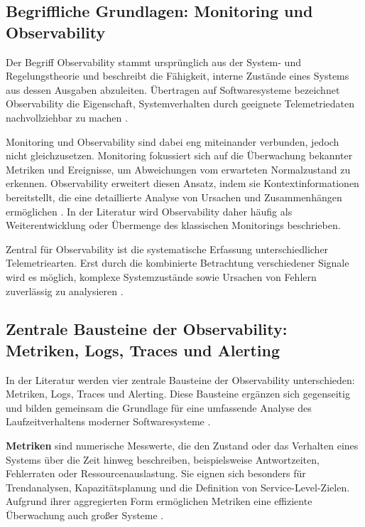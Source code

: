 \subsection{Begriffliche Grundlagen: Monitoring und Observability}

Der Begriff Observability stammt ursprünglich aus der System- und Regelungstheorie und beschreibt die Fähigkeit, interne Zustände eines Systems aus dessen Ausgaben abzuleiten. Übertragen auf Softwaresysteme bezeichnet Observability die Eigenschaft, Systemverhalten durch geeignete Telemetriedaten nachvollziehbar zu machen \cite{sridharan2018distributed}. 

Monitoring und Observability sind dabei eng miteinander verbunden, jedoch nicht gleichzusetzen. Monitoring fokussiert sich auf die Überwachung bekannter Metriken und Ereignisse, um Abweichungen vom erwarteten Normalzustand zu erkennen. Observability erweitert diesen Ansatz, indem sie Kontextinformationen bereitstellt, die eine detaillierte Analyse von Ursachen und Zusammenhängen ermöglichen \cite{faseeha2025observability}. In der Literatur wird Observability daher häufig als Weiterentwicklung oder Übermenge des klassischen Monitorings beschrieben.

Zentral für Observability ist die systematische Erfassung unterschiedlicher Telemetriearten. Erst durch die kombinierte Betrachtung verschiedener Signale wird es möglich, komplexe Systemzustände sowie Ursachen von Fehlern zuverlässig zu analysieren \cite{abieba2025advanced,sakinala2025observability}.

\subsection{Zentrale Bausteine der Observability: Metriken, Logs, Traces und Alerting}

In der Literatur werden vier zentrale Bausteine der Observability unterschieden: Metriken, Logs, Traces und Alerting. Diese Bausteine ergänzen sich gegenseitig und bilden gemeinsam die Grundlage für eine umfassende Analyse des Laufzeitverhaltens moderner Softwaresysteme \cite{abieba2025advanced,sakinala2025observability}.

\textbf{Metriken} sind numerische Messwerte, die den Zustand oder das Verhalten eines Systems über die Zeit hinweg beschreiben, beispielsweise Antwortzeiten, Fehlerraten oder Ressourcenauslastung. Sie eignen sich besonders für Trendanalysen, Kapazitätsplanung und die Definition von Service-Level-Zielen. Aufgrund ihrer aggregierten Form ermöglichen Metriken eine effiziente Überwachung auch großer Systeme \cite{sakinala2025observability}.

